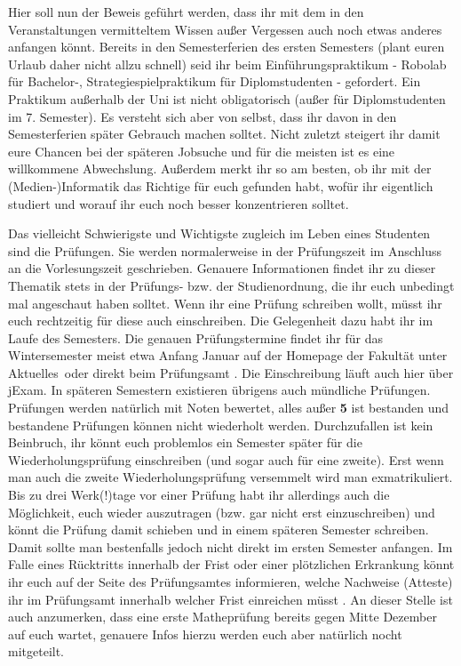 
Hier soll nun der Beweis geführt werden, dass ihr mit dem in den Veranstaltungen vermitteltem Wissen außer Vergessen auch noch etwas anderes anfangen könnt.
Bereits in den Semesterferien des ersten Semesters (plant euren Urlaub daher nicht allzu schnell) seid ihr beim Einführungspraktikum - Robolab für Bachelor-, Strategiespielpraktikum für Diplomstudenten - gefordert.
Ein Praktikum außerhalb der Uni ist nicht obligatorisch (außer für Diplomstudenten im 7. Semester).
Es versteht sich aber von selbst, dass ihr davon in den Semesterferien später Gebrauch machen solltet.
Nicht zuletzt steigert ihr damit eure Chancen bei der späteren Jobsuche und für die meisten ist es eine willkommene Abwechslung.
Außerdem merkt ihr so am besten, ob ihr mit der (Medien-)Informatik das Richtige für euch gefunden habt, wofür ihr eigentlich studiert und worauf ihr euch noch besser konzentrieren solltet.


Das vielleicht Schwierigste und Wichtigste zugleich im Leben eines Studenten sind die Prüfungen.
Sie werden normalerweise in der Prüfungszeit im Anschluss an die Vorlesungszeit geschrieben.
Genauere Informationen findet ihr zu dieser Thematik stets in der Prüfungs- bzw. der Studienordnung, die ihr euch unbedingt mal angeschaut haben solltet.
Wenn ihr eine Prüfung schreiben wollt, müsst ihr euch rechtzeitig für diese auch einschreiben.
Die Gelegenheit dazu habt ihr im Laufe des Semesters.
Die genauen Prüfungstermine findet ihr für das Wintersemester meist etwa Anfang Januar auf der Homepage der Fakultät \link unter \glqq Aktuelles\grqq\ oder direkt beim Prüfungsamt \link.
Die Einschreibung läuft auch hier über jExam.
In späteren Semestern existieren übrigens auch mündliche Prüfungen.
Prüfungen werden natürlich mit Noten bewertet, alles außer \textbf{5} ist bestanden und bestandene Prüfungen können nicht wiederholt werden.
Durchzufallen ist kein Beinbruch, ihr könnt euch problemlos ein Semester später für die Wiederholungsprüfung einschreiben (und sogar auch für eine zweite).
Erst wenn man auch die zweite Wiederholungsprüfung versemmelt wird man exmatrikuliert.
Bis zu drei Werk(!)tage vor einer Prüfung habt ihr allerdings auch die Möglichkeit, euch wieder auszutragen (bzw. gar nicht erst einzuschreiben) und könnt die Prüfung damit schieben und in einem späteren Semester schreiben.
Damit sollte man bestenfalls jedoch nicht direkt im ersten Semester anfangen.
Im Falle eines Rücktritts innerhalb der Frist oder einer plötzlichen Erkrankung könnt ihr euch auf der Seite des Prüfungsamtes informieren, welche Nachweise (Atteste) ihr im Prüfungsamt innerhalb welcher Frist einreichen müsst \link.
An dieser Stelle ist auch anzumerken, dass eine erste Matheprüfung bereits gegen Mitte Dezember auf euch wartet, genauere Infos hierzu werden euch aber natürlich nocht mitgeteilt.

